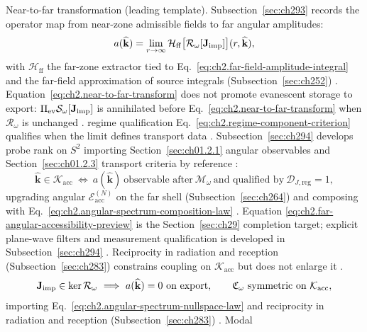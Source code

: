 Near-to-far transformation (leading template). Subsection~\ref{sec:ch293} records the operator map from near-zone admissible fields to far
angular amplitudes:
\begin{equation}
\label{eq:ch2.near-to-far-transform}
a(\widehat{\mathbf{k}})
=
\lim_{r\to\infty}
\mathcal{H}_{\mathrm{ff}}\big[\mathcal{R}_\omega[\mathbf{J}_{\mathrm{imp}}]\big](r,\widehat{\mathbf{k}}),
\end{equation}
with \(\mathcal{H}_{\mathrm{ff}}\) the far-zone extractor tied to
Eq.~\eqref{eq:ch2.far-field-amplitude-integral} and the far-field approximation of source integrals (Subsection~\ref{sec:ch252}) \cite{stratton1941}.
Equation~\eqref{eq:ch2.near-to-far-transform} does not promote evanescent storage to
export: \(\Pi_{\mathrm{ev}}\mathcal{S}_\omega[\mathbf{J}_{\mathrm{imp}}]\) is annihilated before
Eq.~\eqref{eq:ch2.near-to-far-transform} when \(\mathcal{R}_\omega\) is unchanged
\cite{stratton1941}. regime qualification Eq.~\eqref{eq:ch2.regime-component-criterion} qualifies when the
limit defines transport data \cite{harrington2001}.
Subsection~\ref{sec:ch294} develops probe rank on \(S^{2}\) importing Section~\ref{sec:ch01.2.1}
angular observables and Section~\ref{sec:ch01.2.3} transport criteria by reference
\cite{stratton1941}:
\begin{equation}
\label{eq:ch2.far-angular-accessibility-preview}
\widehat{\mathbf{k}}\in\mathcal{K}_{\mathrm{acc}}
\ \Longleftrightarrow\
a(\widehat{\mathbf{k}})\ \text{observable after}\ \mathcal{M}_\omega
\ \text{and qualified by}\ \mathcal{D}_{J,\mathrm{reg}}=1,
\end{equation}
upgrading angular $\mathcal{E}_{\mathrm{acc}}^{(N)}$ on the far shell (Subsection~\ref{sec:ch264}) and composing with
Eq.~\eqref{eq:ch2.angular-spectrum-composition-law} \cite{stratton1941}. Equation
\eqref{eq:ch2.far-angular-accessibility-preview} is the Section~\ref{sec:ch29} completion target;
explicit plane-wave filters and measurement qualification is developed in Subsection~\ref{sec:ch294}
\cite{harrington2001}. Reciprocity in radiation and reception (Subsection~\ref{sec:ch283}) constrains
coupling on \(\mathcal{K}_{\mathrm{acc}}\) but does not enlarge it \cite{stratton1941}.
\begin{equation}
\label{eq:ch2.angular-action-composition}
\Jimp\in\ker\mathcal{R}_\omega
\ \Longrightarrow\
a(\widehat{\mathbf{k}})=0
\ \text{on export},
\qquad
\mathfrak{C}_\omega\ \text{symmetric on}\ \mathcal{K}_{\mathrm{acc}},
\end{equation}
importing Eq.~\eqref{eq:ch2.angular-spectrum-nullspace-law} and reciprocity in radiation and reception (Subsection~\ref{sec:ch283}) \cite{stratton1941}. Modal
